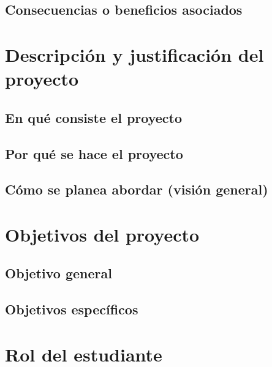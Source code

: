 



\subsection{Consecuencias o beneficios asociados}

\section{Descripción y justificación del proyecto}
\subsection{En qué consiste el proyecto}
\subsection{Por qué se hace el proyecto}
\subsection{Cómo se planea abordar (visión general)}

\section{Objetivos del proyecto}
\subsection{Objetivo general}
\subsection{Objetivos específicos}

\section{Rol del estudiante}
